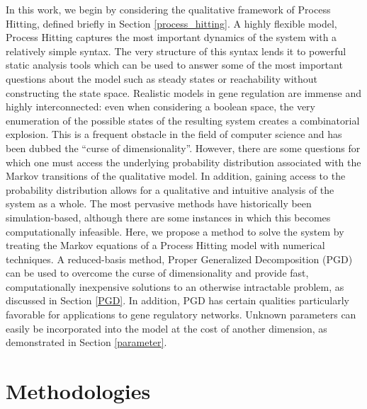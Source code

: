 \documentclass{article}
\begin{document}
In this work, we begin by considering the qualitative framework of Process Hitting, defined briefly in Section \ref{process_hitting}. A highly flexible model, Process Hitting captures the most important dynamics of the system with a relatively simple syntax. The very structure of this syntax lends it to powerful static analysis tools which can be used to answer some of the most important questions about the model such as steady states or reachability without constructing the state space. Realistic models in gene regulation are immense and highly interconnected: even when considering a boolean space, the very enumeration of the possible states of the resulting system creates a combinatorial explosion. This is a frequent obstacle in the field of computer science and has been dubbed the ``curse of dimensionality''. However, there are some questions for which one must access the underlying probability distribution associated with the Markov transitions of the qualitative model. In addition, gaining access to the probability distribution allows for a qualitative and intuitive analysis of the system as a whole. The most pervasive methods have historically been simulation-based, although there are some instances in which this becomes computationally infeasible. Here, we propose a method to solve the system by treating the Markov equations of a Process Hitting model with numerical techniques. A reduced-basis method, Proper Generalized Decomposition (PGD) can be used to overcome the curse of dimensionality and provide fast, computationally inexpensive solutions to an otherwise intractable problem, as discussed in Section \ref{PGD}. In addition, PGD has certain qualities particularly favorable for applications to gene regulatory networks. Unknown parameters can easily be incorporated into the model at the cost of another dimension, as demonstrated in Section \ref{parameter}.


\section{Methodologies}
\end{document}
